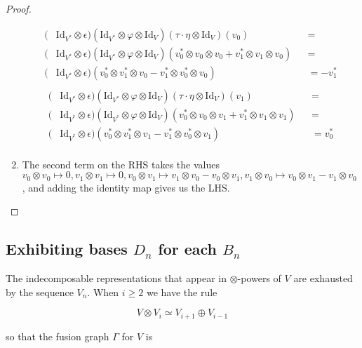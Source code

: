 \documentclass[11pt]{article} %
\begin{document}
\begin{proof}
\begin{enumerate}[$R_1$:]
\begin{align*}
(&\text{Id}_{V^{\ast}}\otimes \epsilon)(\text{Id}_{V^\ast} \otimes \varphi \otimes \text{Id}_V)(\tau \cdot \eta \otimes \text{Id}_V)(v_0) & &= \\
(&\text{Id}_{V^{\ast}}\otimes \epsilon)(\text{Id}_{V^\ast} \otimes \varphi \otimes \text{Id}_V)(v_0^{\ast} \otimes v_0 \otimes v_0 + v_1^{\ast} \otimes v_1 \otimes v_0) & &= \\
(&\text{Id}_{V^{\ast}}\otimes \epsilon)(v_0^{\ast} \otimes v_1^{\ast} \otimes v_0 - v_1^{\ast} \otimes v_0^{\ast} \otimes v_0) & &= -v_1^{\ast} \\
\end{align*}
\begin{align*}
(&\text{Id}_{V^{\ast}}\otimes \epsilon)(\text{Id}_{V^\ast} \otimes \varphi \otimes \text{Id}_V)(\tau \cdot \eta \otimes \text{Id}_V)(v_1) & &= \\
(&\text{Id}_{V^{\ast}}\otimes \epsilon)(\text{Id}_{V^\ast} \otimes \varphi \otimes \text{Id}_V)(v_0^{\ast} \otimes v_0 \otimes v_1 + v_1^{\ast} \otimes v_1 \otimes v_1) & &= \\
(&\text{Id}_{V^{\ast}}\otimes \epsilon)(v_0^{\ast} \otimes v_1^{\ast} \otimes v_1 - v_1^{\ast} \otimes v_0^{\ast} \otimes v_1) & &= v_0^{\ast}\\
\end{align*}

\item The second term on the RHS takes the values $v_0 \otimes v_0 \mapsto 0, v_1 \otimes v_1 \mapsto 0, v_0 \otimes v_1 \mapsto v_1 \otimes v_0 - v_0 \otimes v_1, v_1 \otimes v_0 \mapsto v_0 \otimes v_1 - v_1 \otimes v_0$, and adding the identity map gives us the LHS.
\end{enumerate}

\end{proof}

\subsection{Exhibiting bases $D_n$ for each $B_n$}

The indecomposable representations that appear in $\otimes$-powers of $V$ are exhausted by the sequence $V_n$. When $i \geq 2$ we have the rule

\begin{equation} \label{eq1}
V \otimes V_i \simeq V_{i+1} \oplus V_{i-1}
\end{equation}

so that the fusion graph $\Gamma$ for $V$ is
\end{document}
